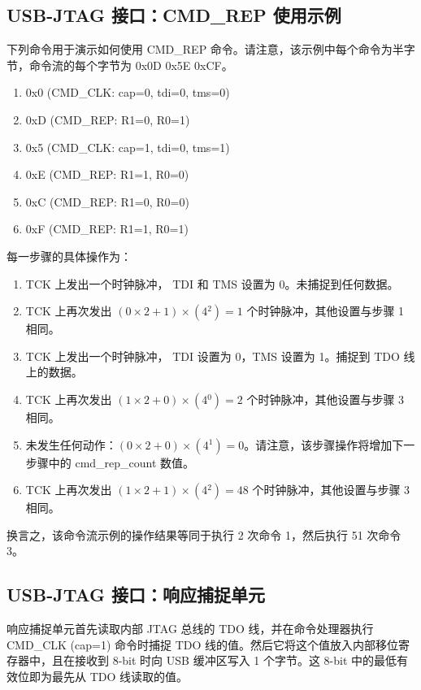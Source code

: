 \documentclass[main\_\_CN.tex]{subfiles}
\begin{document}
\subsection{USB-JTAG 接口：CMD\_REP 使用示例}    

下列命令用于演示如何使用 CMD\_REP 命令。请注意，该示例中每个命令为半字节，命令流的每个字节为 0x0D 0x5E 0xCF。

\begin{enumerate}
\item 0x0 (CMD\_CLK: cap=0, tdi=0, tms=0)
\item 0xD (CMD\_REP: R1=0, R0=1)
\item 0x5 (CMD\_CLK: cap=1, tdi=0, tms=1)
\item 0xE (CMD\_REP: R1=1, R0=0)
\item 0xC (CMD\_REP: R1=0, R0=0)
\item 0xF (CMD\_REP: R1=1, R0=1)
\end{enumerate}

每一步骤的具体操作为：

\begin{enumerate}
\item TCK 上发出一个时钟脉冲， TDI 和 TMS 设置为 0。未捕捉到任何数据。
\item TCK 上再次发出 \((0\times2+1)\times(4{^2})=1\) 个时钟脉冲，其他设置与步骤 1 相同。
\item TCK 上发出一个时钟脉冲， TDI 设置为 0，TMS 设置为 1。捕捉到 TDO 线上的数据。
\item TCK 上再次发出 \((1\times2+0)\times(4{^0})=2\) 个时钟脉冲，其他设置与步骤 3 相同。
\item 未发生任何动作：\((0\times2+0)\times(4{^1})=0\)。请注意，该步骤操作将增加下一步骤中的 cmd\_rep\_count 数值。
\item TCK 上再次发出 \((1\times2+1)\times(4{^2})=48\) 个时钟脉冲，其他设置与步骤 3 相同。
\end{enumerate}

换言之，该命令流示例的操作结果等同于执行 2 次命令 1，然后执行 51 次命令 3。

\subsection{USB-JTAG 接口：响应捕捉单元}

响应捕捉单元首先读取内部 JTAG 总线的 TDO 线，并在命令处理器执行 CMD\_CLK (cap=1) 命令时捕捉 TDO 线的值。然后它将这个值放入内部移位寄存器中，且在接收到 8-bit 时向 USB 缓冲区写入 1 个字节。这 8-bit 中的最低有效位即为最先从 TDO 线读取的值。
\end{document}
